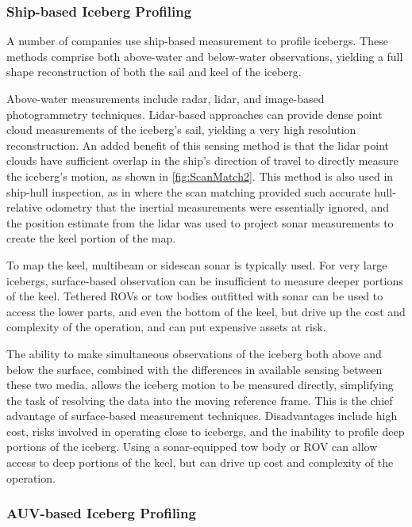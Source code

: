 \subsubsection{Ship-based Iceberg Profiling}

A number of companies use ship-based measurement to profile icebergs. These methods comprise both above-water and below-water observations, yielding a full shape reconstruction of both the sail and keel of the iceberg. 

Above-water measurements include radar, lidar, and image-based photogrammetry techniques. Lidar-based approaches can provide dense point cloud measurements of the iceberg's sail, yielding a very high resolution reconstruction. An added benefit of this sensing method is that the lidar point clouds have sufficient overlap in the ship's direction of travel to directly measure the iceberg's motion, as shown in \ref{fig:ScanMatch2}. This method is also used in ship-hull inspection, as in \cite{Papadopoulos2014} where the scan matching provided such accurate hull-relative odometry that the inertial measurements were essentially ignored, and the position estimate from the lidar was used to project sonar measurements to create the keel portion of the map.

To map the keel, multibeam or sidescan sonar is typically used. For very large icebergs, surface-based observation can be insufficient to measure deeper portions of the keel. Tethered ROVs or tow bodies outfitted with sonar can be used to access the lower parts, and even the bottom of the keel, but drive up the cost and complexity of the operation, and can put expensive assets at risk. 

The ability to make simultaneous observations of the iceberg both above and below the surface, combined with the differences in available sensing between these two media, allows the iceberg motion to be measured directly, simplifying the task of resolving the data into the moving reference frame. This is the chief advantage of surface-based measurement techniques. Disadvantages include high cost, risks involved in operating close to icebergs, and the inability to profile deep portions of the iceberg. Using a sonar-equipped tow body or ROV can allow access to deep portions of the keel, but can drive up cost and complexity of the operation. 


\subsubsection{AUV-based Iceberg Profiling}

